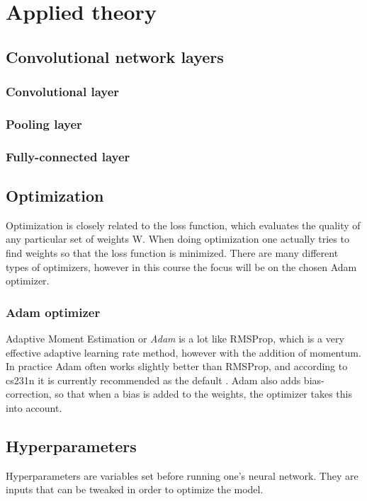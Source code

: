 \chapter{Applied theory}
\label{chp:theory}

\section{Convolutional network layers}


\subsection{Convolutional layer}

\subsection{Pooling layer}

\subsection{Fully-connected layer}


\section{Optimization}
Optimization is closely related to the loss function, which evaluates the quality of any particular set of weights W. When doing optimization one actually tries to find weights so that the loss function is minimized. There are many different types of optimizers, however in this course the focus will be on the chosen Adam optimizer. 

\subsection{Adam optimizer}
Adaptive Moment Estimation or \emph{Adam} is a lot like RMSProp, which is a very effective adaptive learning rate method, however with the addition of momentum. In practice Adam often works slightly better than RMSProp, and according to cs231n it is currently recommended as the default \citep{NN3}. Adam also adds bias-correction, so that when a bias is added to the weights, the optimizer takes this into account. 


\section{Hyperparameters}
Hyperparameters are variables set before running one's neural network. They are inputs that can be tweaked in order to optimize the model. 


